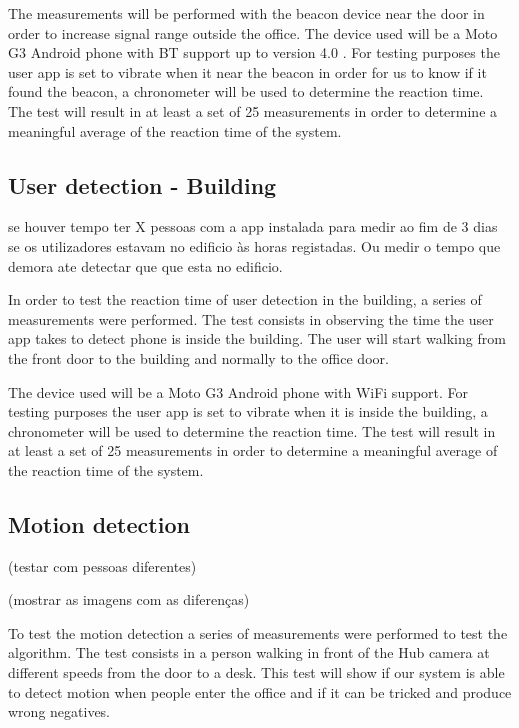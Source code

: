 The measurements will be performed with the beacon device near the door in order to increase signal range outside the office. The device used will be a Moto G3 Android phone with BT support up to version 4.0 .
For testing purposes the user app is set to vibrate when it near the beacon in order for us to know if it found the beacon, a chronometer will be used to determine the reaction time. The test will result in at least a set of 25 measurements in order to determine a meaningful average of the reaction time of the system.


\subsection{User detection - Building}

se houver tempo ter X pessoas com a app instalada para medir ao fim de 3 dias se os utilizadores estavam no edificio às horas registadas.
Ou medir o tempo que demora ate detectar que que esta no edificio.


In order to test the reaction time of user detection in the building, a series of measurements were performed. The test consists in observing the time the user app takes to detect phone is inside the building. The user will start walking from the front door to the building and normally to the office door.

The device used will be a Moto G3 Android phone with WiFi support.
For testing purposes the user app is set to vibrate when it is inside the building, a chronometer will be used to determine the reaction time. The test will result in at least a set of 25 measurements in order to determine a meaningful average of the reaction time of the system.



\subsection{Motion detection}

(testar com pessoas diferentes)

(mostrar as imagens com as diferenças)

To test the motion detection a series of measurements were performed to test the algorithm. The test consists in a person walking in front of the Hub camera at different speeds from the door to a desk. This test will show if our system is able to detect motion when people enter the office and if it can be tricked and produce wrong negatives.




